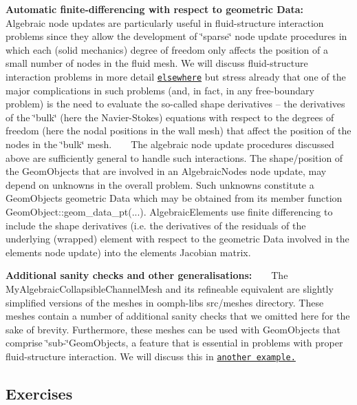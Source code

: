 \begin{DoxyItemize}
\item {\bfseries Automatic finite-\/differencing with respect to geometric Data\+:} ~\newline
~\newline
 Algebraic node updates are particularly useful in fluid-\/structure interaction problems since they allow the development of \char`\"{}sparse\char`\"{} node update procedures in which each (solid mechanics) degree of freedom only affects the position of a small number of nodes in the fluid mesh. We will discuss fluid-\/structure interaction problems in more detail \href{../../../interaction/fsi_collapsible_channel_algebraic/html/index.html}{\tt elsewhere} but stress already that one of the major complications in such problems (and, in fact, in any free-\/boundary problem) is the need to evaluate the so-\/called shape derivatives -- the derivatives of the \char`\"{}bulk\char`\"{} (here the Navier-\/\+Stokes) equations with respect to the degrees of freedom (here the nodal positions in the wall mesh) that affect the position of the nodes in the \char`\"{}bulk\char`\"{} mesh. ~\newline
~\newline
 The algebraic node update procedures discussed above are sufficiently general to handle such interactions. The shape/position of the {\ttfamily Geom\+Objects} that are involved in an {\ttfamily Algebraic\+Node\textquotesingle{}s} node update, may depend on unknowns in the overall problem. Such unknowns constitute a {\ttfamily Geom\+Object\textquotesingle{}s} geometric {\ttfamily Data} which may be obtained from its member function {\ttfamily Geom\+Object\+::geom\+\_\+data\+\_\+pt}(...). {\ttfamily Algebraic\+Elements} use finite differencing to include the shape derivatives (i.\+e. the derivatives of the residuals of the underlying (wrapped) element with respect to the geometric {\ttfamily Data} involved in the element\textquotesingle{}s node update) into the element\textquotesingle{}s Jacobian matrix. ~\newline
~\newline

\item {\bfseries Additional sanity checks and other generalisations\+:} ~\newline
 ~\newline
 The {\ttfamily My\+Algebraic\+Collapsible\+Channel\+Mesh} and its refineable equivalent are slightly simplified versions of the meshes in {\ttfamily oomph-\/lib\textquotesingle{}s} {\ttfamily src/meshes} directory. These meshes contain a number of additional sanity checks that we omitted here for the sake of brevity. Furthermore, these meshes can be used with {\ttfamily Geom\+Objects} that comprise \char`\"{}sub-\/\char`\"{}{\ttfamily Geom\+Objects}, a feature that is essential in problems with proper fluid-\/structure interaction. We will discuss this in \href{../../../interaction/fsi_collapsible_channel_algebraic/html/index.html}{\tt another example.}
\end{DoxyItemize}\hypertarget{index_exx}{}\subsection{Exercises}\label{index_exx}

